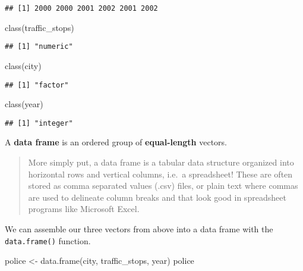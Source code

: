 \documentclass[
]{article}
\newenvironment{Shaded}{\begin{snugshade}}{\end{snugshade}}
\newcommand{\FunctionTok}[1]{\textcolor[rgb]{0.00,0.00,0.00}{#1}}
\newcommand{\NormalTok}[1]{#1}
\newcommand{\OtherTok}[1]{\textcolor[rgb]{0.56,0.35,0.01}{#1}}
\begin{document}
\begin{verbatim}
## [1] 2000 2000 2001 2002 2001 2002
\end{verbatim}

\begin{Shaded}
\begin{Highlighting}[]
\FunctionTok{class}\NormalTok{(traffic\_stops)}
\end{Highlighting}
\end{Shaded}

\begin{verbatim}
## [1] "numeric"
\end{verbatim}

\begin{Shaded}
\begin{Highlighting}[]
\FunctionTok{class}\NormalTok{(city)}
\end{Highlighting}
\end{Shaded}

\begin{verbatim}
## [1] "factor"
\end{verbatim}

\begin{Shaded}
\begin{Highlighting}[]
\FunctionTok{class}\NormalTok{(year)}
\end{Highlighting}
\end{Shaded}

\begin{verbatim}
## [1] "integer"
\end{verbatim}

A \textbf{data frame} is an ordered group of \textbf{equal-length}
vectors.

\begin{quote}
More simply put, a data frame is a tabular data structure organized into
horizontal rows and vertical columns, i.e.~a spreadsheet! These are
often stored as comma separated values (.csv) files, or plain text where
commas are used to delineate column breaks and that look good in
spreadsheet programs like Microsoft Excel.
\end{quote}

We can assemble our three vectors from above into a data frame with the
\texttt{data.frame()} function.

\begin{Shaded}
\begin{Highlighting}[]
\NormalTok{police }\OtherTok{\textless{}{-}} \FunctionTok{data.frame}\NormalTok{(city, traffic\_stops, year)}
\NormalTok{police}
\end{Highlighting}
\end{Shaded}
\end{document}
